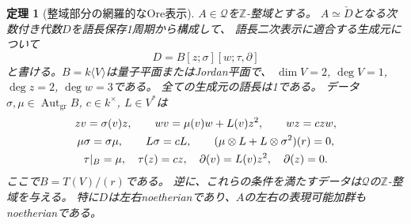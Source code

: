 \documentclass[11pt,a4paper]{ltjsarticle}
\newtheorem{theorem}{定理}[section]
\theoremstyle{definition}
\newcommand{\Aut}{\operatorname{Aut}}
\begin{document}
\begin{theorem}[整域部分の網羅的なOre表示]\label{idx:thm:domain-ore}
$A\in\mathcal Q$を$\mathbb Z$-整域とする。
$A\simeq\check D$となる次数付き代数$D$を語長保存1周期から構成して、
語長二次表示に適合する生成元について
\[
D=B[z;\sigma][w;\tau,\partial]
\]
と書ける。$B=k\langle V\rangle$は量子平面またはJordan平面で、
$\dim V=2$, $\deg V=1$, $\deg z=2$, $\deg w=3$である。
全ての生成元の語長は1である。
データ$\sigma,\mu\in\Aut_{\mathrm{gr}}B$, $c\in k^\times$, $L\in V^*$は
\begin{gather}
zv=\sigma(v)z,\qquad
wv=\mu(v)w+L(v)z^2,\qquad wz=czw,\label{idx:eq:ore}\\
\mu\sigma=\sigma\mu,\qquad L\sigma=cL,\qquad
(\mu\otimes L+L\otimes\sigma^2)(r)=0,\label{idx:eq:compatibility}\\
\tau|_B=\mu,\quad\tau(z)=cz,\quad
\partial(v)=L(v)z^2,\quad\partial(z)=0.\notag
\end{gather}
ここで$B=T(V)/(r)$である。
逆に、これらの条件を満たすデータは$\mathcal Q$の$\mathbb Z$-整域を与える。
特に$D$は左右noetherianであり、$A$の左右の表現可能加群もnoetherianである。
\end{theorem}
\end{document}
